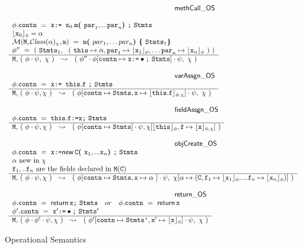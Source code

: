\begin{figure*}
$\begin{array}{l}
\inferenceruleNN {methCall\_OS} {
\\
\phi.\prg{contn}\ =\ \x {\kw{:= }} \x_0.\m \lp \prg{par}_1, ... \prg{par}_n \rp \semi \prg{Stmts}
\\
\interp{\x_0}{\phi} = \alpha
\\
\Meths {} {\ClassOf {\alpha} {\chi}} {\m} \  =  \ \m\lp par_1, \ldots par_n \rp \lb \prg{Stmts}_1   \rb
  \\
 \phi''\ =\  (\  \prg{Stmts}_1,\ \ (\ \this \mapsto \alpha,
  \prg{par}_1 \mapsto  \interp{\x_1}{\phi}, \ldots \prg{par}_n \mapsto  \interp{\x_n}{\phi}\ ) \ )
}
{
 \M,\, (\ \phi\cdot\psi,\ \chi\ )\ \ \leadsto\  \ (\ \phi''\cdot\phi[\prg{contn}\mapsto\x  \kw{:=} \bullet \semi \prg{Stmts}] \cdot\psi,\ \chi\ )
}

\\ \\
\inferenceruleNN {varAssgn\_OS} {
 \phi.\prg{contn} \ = \ \x  {\kw{:= }}   \this.\f \ \semi \prg{Stmts}
}
{
 \M,\,  (\ \phi\cdot\psi, \chi\ )\ \ \leadsto\  \ (\ \phi[ \prg{contn} \mapsto \prg{Stmts}, \x\mapsto \interp{\this.\f}{\phi,\chi}] \cdot\psi,\ \chi\  )
}
\\
\\
\inferenceruleNN{fieldAssgn\_OS} {
 \phi.\prg{contn}\ =\  \this.\f  \kw{:=} \x  \semi \prg{Stmts}
}
{
 \M,\,  (\ \phi\cdot\psi, \chi\  )\ \ \leadsto\  \ (\ \phi[\prg{contn}\mapsto  \prg{Stmts} ] \cdot\psi, \chi[\interp{\this}{\phi},\f \mapsto \interp{\x}{\phi,\chi}]\  )
}
\\
\\
\inferenceruleNN {objCreate\_OS} {
 \phi.\prg{contn}\ =\  \x  \kw{:=} \kwN{new }\, \c \lp \x_1, ... \x_n \rp  \semi \prg{Stmts}
 \\
 \alpha\ \mbox{new in}\ \chi
 \\
\f_1, .. \f_n\ \mbox{are the fields declared in } \M(\c)
}
{
 \M,\,  (\ \phi\cdot\psi, \chi\ )\ \ \leadsto\  \ (\ \phi[\prg{contn}\mapsto  \prg{Stmts},\x \mapsto \alpha\ ] \cdot\psi, \ \chi[\alpha \mapsto (\c,\f_1 \mapsto \interp{\x_1}{\phi},  ... \f_n \mapsto \interp{\x_n}{\phi}  ) ]\ )
}
\\
\\
\inferenceruleNN {return\_OS} {
 \phi.\prg{contn}\ =\   {\kwN{return }}\, \x  \semi \prg{Stmts}\ \  \ or\  \ \  \phi.\prg{contn}\ =\   {\kwN{return}}\, \x
 \\
\phi'.\prg{contn}\ =\  \x' \kw{:=} \bullet  \semi \prg{Stmts}'
}
{
 \M,\,  (\ \phi\cdot\phi'\cdot\psi, \chi\ )\ \ \leadsto\  \ (\ \phi'[\prg{contn}\mapsto  \prg{Stmts'},\x' \mapsto \interp{\x}{\phi}] \cdot\psi, \ \chi \ )
}
\end{array}
$
\caption{Operational Semantics}
\label{fig:Execution}
\end{figure*}

